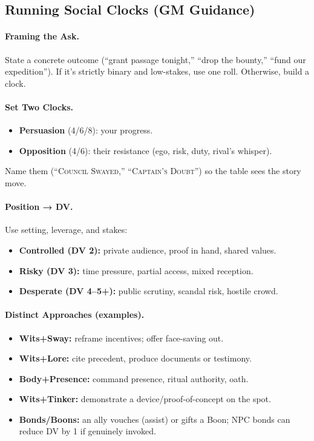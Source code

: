 \subsection{Running Social Clocks (GM Guidance)}

\paragraph{Framing the Ask.}
State a concrete outcome (“grant passage tonight,” “drop the bounty,” “fund our expedition”). If it’s strictly binary and low-stakes, use one roll. Otherwise, build a clock.

\paragraph{Set Two Clocks.}
\begin{itemize}
  \item \textbf{Persuasion} (4/6/8): your progress.
  \item \textbf{Opposition} (4/6): their resistance (ego, risk, duty, rival’s whisper).
\end{itemize}
Name them (“\textsc{Council Swayed},” “\textsc{Captain’s Doubt}”) so the table sees the story move.

\paragraph{Position → DV.}
Use setting, leverage, and stakes:
\begin{itemize}
  \item \textbf{Controlled (DV 2):} private audience, proof in hand, shared values.
  \item \textbf{Risky (DV 3):} time pressure, partial access, mixed reception.
  \item \textbf{Desperate (DV 4–5+):} public scrutiny, scandal risk, hostile crowd.
\end{itemize}

\paragraph{Distinct Approaches (examples).}
\begin{itemize}
  \item \textbf{Wits+Sway:} reframe incentives; offer face-saving out.
  \item \textbf{Wits+Lore:} cite precedent, produce documents or testimony.
  \item \textbf{Body+Presence:} command presence, ritual authority, oath.
  \item \textbf{Wits+Tinker:} demonstrate a device/proof-of-concept on the spot.
  \item \textbf{Bonds/Boons:} an ally vouches (assist) or gifts a Boon; NPC bonds can reduce DV by 1 if genuinely invoked.
\end{itemize}

